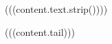 

\begin{center}
(((content.text.strip())))
\label{(((content.id)))}
\end{center}
(((content.tail)))
